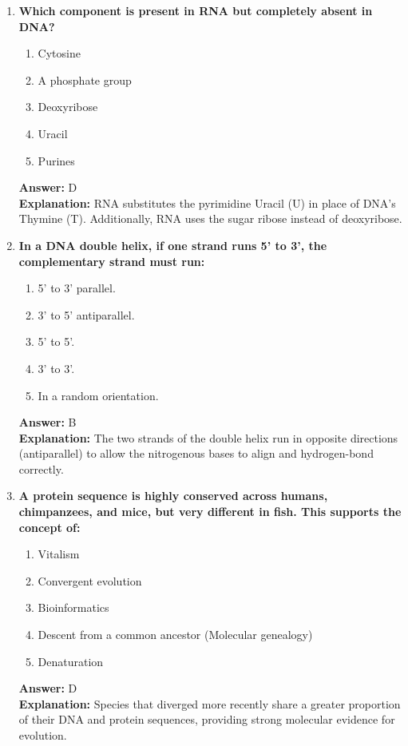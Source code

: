 \documentclass[11pt, a4paper]{article}
\begin{document}
\begin{enumerate}
\item \textbf{Which component is present in RNA but completely absent in DNA?}
\begin{enumerate}[label=\Alph*.]
    \item Cytosine
    \item A phosphate group
    \item Deoxyribose
    \item Uracil
    \item Purines
\end{enumerate}
\textbf{Answer:} D \\
\textbf{Explanation:} RNA substitutes the pyrimidine Uracil (U) in place of DNA's Thymine (T). Additionally, RNA uses the sugar ribose instead of deoxyribose.

\item \textbf{In a DNA double helix, if one strand runs 5' to 3', the complementary strand must run:}
\begin{enumerate}[label=\Alph*.]
    \item 5' to 3' parallel.
    \item 3' to 5' antiparallel.
    \item 5' to 5'.
    \item 3' to 3'.
    \item In a random orientation.
\end{enumerate}
\textbf{Answer:} B \\
\textbf{Explanation:} The two strands of the double helix run in opposite directions (antiparallel) to allow the nitrogenous bases to align and hydrogen-bond correctly.

\item \textbf{A protein sequence is highly conserved across humans, chimpanzees, and mice, but very different in fish. This supports the concept of:}
\begin{enumerate}[label=\Alph*.]
    \item Vitalism
    \item Convergent evolution
    \item Bioinformatics
    \item Descent from a common ancestor (Molecular genealogy)
    \item Denaturation
\end{enumerate}
\textbf{Answer:} D \\
\textbf{Explanation:} Species that diverged more recently share a greater proportion of their DNA and protein sequences, providing strong molecular evidence for evolution.


\end{enumerate}
\end{document}
